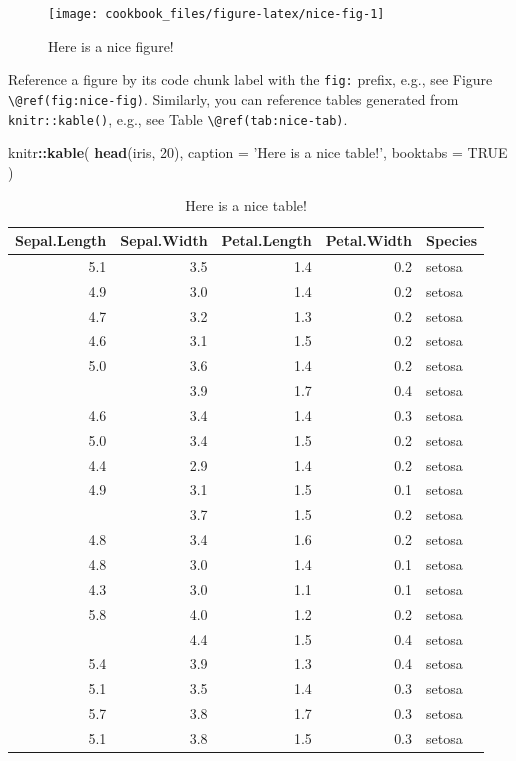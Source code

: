 \documentclass[]{book}
\newenvironment{Shaded}{\begin{snugshade}}{\end{snugshade}}
\newcommand{\DataTypeTok}[1]{\textcolor[rgb]{0.13,0.29,0.53}{#1}}
\newcommand{\DecValTok}[1]{\textcolor[rgb]{0.00,0.00,0.81}{#1}}
\newcommand{\KeywordTok}[1]{\textcolor[rgb]{0.13,0.29,0.53}{\textbf{#1}}}
\newcommand{\NormalTok}[1]{#1}
\newcommand{\OperatorTok}[1]{\textcolor[rgb]{0.81,0.36,0.00}{\textbf{#1}}}
\newcommand{\OtherTok}[1]{\textcolor[rgb]{0.56,0.35,0.01}{#1}}
\newcommand{\StringTok}[1]{\textcolor[rgb]{0.31,0.60,0.02}{#1}}
\begin{document}
\begin{figure}

{\centering \texttt{[image: cookbook\_files/figure-latex/nice-fig-1]} 

}

\caption{Here is a nice figure!}\label{fig:nice-fig}
\end{figure}

Reference a figure by its code chunk label with the \texttt{fig:} prefix, e.g., see Figure \texttt{\textbackslash{}@ref(fig:nice-fig)}. Similarly, you can reference tables generated from \texttt{knitr::kable()}, e.g., see Table \texttt{\textbackslash{}@ref(tab:nice-tab)}.

\begin{Shaded}
\begin{Highlighting}[]
\NormalTok{knitr}\OperatorTok{::}\KeywordTok{kable}\NormalTok{(}
  \KeywordTok{head}\NormalTok{(iris, }\DecValTok{20}\NormalTok{), }\DataTypeTok{caption =} \StringTok{'Here is a nice table!'}\NormalTok{,}
  \DataTypeTok{booktabs =} \OtherTok{TRUE}
\NormalTok{)}
\end{Highlighting}
\end{Shaded}

\begin{table}

\caption{\label{tab:nice-tab}Here is a nice table!}
\centering
\begin{tabular}[t]{rrrrl}
\toprule
Sepal.Length & Sepal.Width & Petal.Length & Petal.Width & Species\\
\midrule
5.1 & 3.5 & 1.4 & 0.2 & setosa\\
4.9 & 3.0 & 1.4 & 0.2 & setosa\\
4.7 & 3.2 & 1.3 & 0.2 & setosa\\
4.6 & 3.1 & 1.5 & 0.2 & setosa\\
5.0 & 3.6 & 1.4 & 0.2 & setosa\\
\addlinespace
5.4 & 3.9 & 1.7 & 0.4 & setosa\\
4.6 & 3.4 & 1.4 & 0.3 & setosa\\
5.0 & 3.4 & 1.5 & 0.2 & setosa\\
4.4 & 2.9 & 1.4 & 0.2 & setosa\\
4.9 & 3.1 & 1.5 & 0.1 & setosa\\
\addlinespace
5.4 & 3.7 & 1.5 & 0.2 & setosa\\
4.8 & 3.4 & 1.6 & 0.2 & setosa\\
4.8 & 3.0 & 1.4 & 0.1 & setosa\\
4.3 & 3.0 & 1.1 & 0.1 & setosa\\
5.8 & 4.0 & 1.2 & 0.2 & setosa\\
\addlinespace
5.7 & 4.4 & 1.5 & 0.4 & setosa\\
5.4 & 3.9 & 1.3 & 0.4 & setosa\\
5.1 & 3.5 & 1.4 & 0.3 & setosa\\
5.7 & 3.8 & 1.7 & 0.3 & setosa\\
5.1 & 3.8 & 1.5 & 0.3 & setosa\\
\bottomrule
\end{tabular}
\end{table}
\end{document}
